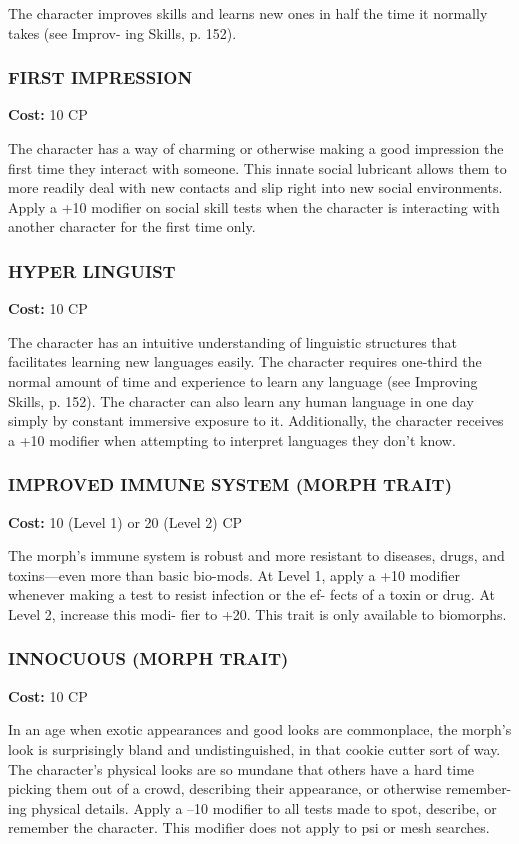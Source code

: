 The character improves skills and learns new
ones in half the time it normally takes (see Improv-
ing Skills, p. 152).

\subsubsection{FIRST IMPRESSION}
\textbf{Cost:} 10 CP

The character has a way of charming or otherwise
making a good impression the first time they interact
with someone. This innate social lubricant allows them
to more readily deal with new contacts and slip right
into new social environments. Apply a +10 modifier
on social skill tests when the character is interacting
with another character for the first time only.

\subsubsection{HYPER LINGUIST}
\textbf{Cost:} 10 CP

The character has an intuitive understanding of
linguistic structures that facilitates learning new
languages easily. The character requires one-third the
normal amount of time and experience to learn any
language (see Improving Skills, p. 152). The character
can also learn any human language in one day simply
by constant immersive exposure to it. Additionally,
the character receives a +10 modifier when attempting
to interpret languages they don’t know.

\subsubsection{IMPROVED IMMUNE SYSTEM (MORPH TRAIT)}
\textbf{Cost:} 10 (Level 1) or 20 (Level 2) CP

The morph’s immune system is robust and more
resistant to diseases, drugs, and toxins—even more
than basic bio-mods. At Level 1, apply a +10 modifier
whenever making a test to resist infection or the ef-
fects of a toxin or drug. At Level 2, increase this modi-
fier to +20. This trait is only available to biomorphs.

\subsubsection{INNOCUOUS (MORPH TRAIT)}
\textbf{Cost:} 10 CP

In an age when exotic appearances and good looks
are commonplace, the morph’s look is surprisingly
bland and undistinguished, in that cookie cutter sort of
way. The character’s physical looks are so mundane that
others have a hard time picking them out of a crowd,
describing their appearance, or otherwise remember-
ing physical details. Apply a –10 modifier to all tests
made to spot, describe, or remember the character. This
modifier does not apply to psi or mesh searches.

